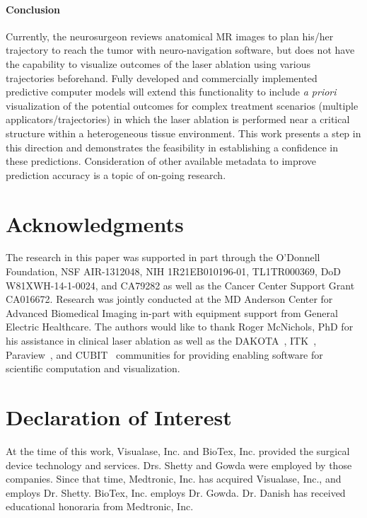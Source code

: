 \documentclass[12pt]{article}
\begin{document}
\paragraph{Conclusion}
Currently, the neurosurgeon reviews anatomical MR images to plan his/her
trajectory to reach the tumor with neuro-navigation software, but does not
have the capability to visualize outcomes of the laser ablation using
various trajectories beforehand. 
Fully developed and commercially implemented predictive computer models 
will extend this functionality to include \textit{a priori} visualization of the
potential outcomes for complex treatment scenarios (multiple
applicators/trajectories) in which the laser ablation is performed near a
critical structure within a heterogeneous tissue environment. 
This work presents a step in this direction and demonstrates
the feasibility in establishing a confidence in these predictions.
Consideration of other available metadata to improve prediction accuracy
is a topic of on-going research.


\section*{Acknowledgments}

The research in this paper was supported in part through the O'Donnell Foundation,
NSF AIR-1312048, NIH 1R21EB010196-01, TL1TR000369, DoD W81XWH-14-1-0024,
 and CA79282 as well as the Cancer Center Support
Grant CA016672.
Research was jointly conducted at the MD Anderson Center for Advanced
Biomedical Imaging in-part with equipment support from General Electric
Healthcare.
The authors would like to thank Roger McNichols, PhD 
for his assistance in clinical laser ablation as well as the
DAKOTA~\cite{eldred2007dakota},
ITK~\cite{ITKSoftwareGuideSecondEdition}, 
Paraview~\cite{Paraview}, and
CUBIT~\cite{cubit} communities for providing enabling software for
scientific computation and visualization.  



\section*{Declaration of Interest}

At the time of this work, Visualase, Inc. and BioTex, Inc. provided
the surgical device technology and services. Drs. Shetty and Gowda
were employed by those companies. Since that time, Medtronic, Inc.
has acquired Visualase, Inc., and employs Dr. Shetty. BioTex, Inc.
employs Dr. Gowda. Dr. Danish has received educational honoraria
from Medtronic, Inc.
\end{document}
